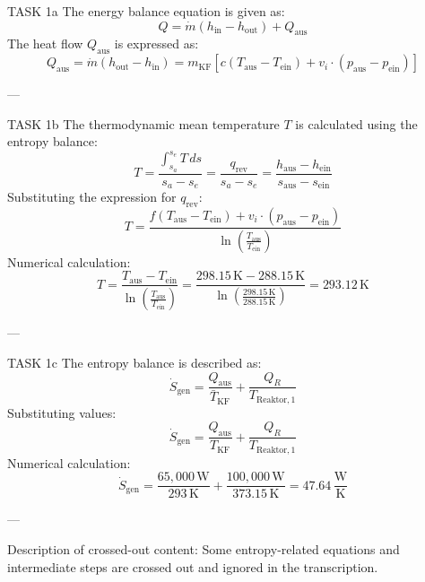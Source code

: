 TASK 1a  
The energy balance equation is given as:  
\[
Q = \dot{m} \left( h_{\text{in}} - h_{\text{out}} \right) + Q_{\text{aus}}
\]  
The heat flow \( Q_{\text{aus}} \) is expressed as:  
\[
Q_{\text{aus}} = \dot{m} \left( h_{\text{out}} - h_{\text{in}} \right) = m_{\text{KF}} \left[ c \left( T_{\text{aus}} - T_{\text{ein}} \right) + v_i \cdot \left( p_{\text{aus}} - p_{\text{ein}} \right) \right]
\]  

---

TASK 1b  
The thermodynamic mean temperature \( T \) is calculated using the entropy balance:  
\[
T = \frac{\int_{s_a}^{s_e} T \, ds}{s_a - s_e} = \frac{q_{\text{rev}}}{s_a - s_e} = \frac{h_{\text{aus}} - h_{\text{ein}}}{s_{\text{aus}} - s_{\text{ein}}}
\]  
Substituting the expression for \( q_{\text{rev}} \):  
\[
T = \frac{f \left( T_{\text{aus}} - T_{\text{ein}} \right) + v_i \cdot \left( p_{\text{aus}} - p_{\text{ein}} \right)}{\ln \left( \frac{T_{\text{aus}}}{T_{\text{ein}}} \right)}
\]  
Numerical calculation:  
\[
T = \frac{T_{\text{aus}} - T_{\text{ein}}}{\ln \left( \frac{T_{\text{aus}}}{T_{\text{ein}}} \right)} = \frac{298.15 \, \text{K} - 288.15 \, \text{K}}{\ln \left( \frac{298.15 \, \text{K}}{288.15 \, \text{K}} \right)} = 293.12 \, \text{K}
\]  

---

TASK 1c  
The entropy balance is described as:  
\[
\dot{S}_{\text{gen}} = \frac{Q_{\text{aus}}}{\bar{T}_{\text{KF}}} + \frac{Q_R}{T_{\text{Reaktor},1}}
\]  
Substituting values:  
\[
\dot{S}_{\text{gen}} = \frac{Q_{\text{aus}}}{T_{\text{KF}}} + \frac{Q_R}{T_{\text{Reaktor},1}}
\]  
Numerical calculation:  
\[
\dot{S}_{\text{gen}} = \frac{65,000 \, \text{W}}{293 \, \text{K}} + \frac{100,000 \, \text{W}}{373.15 \, \text{K}} = 47.64 \, \frac{\text{W}}{\text{K}}
\]  

---

Description of crossed-out content:  
Some entropy-related equations and intermediate steps are crossed out and ignored in the transcription.